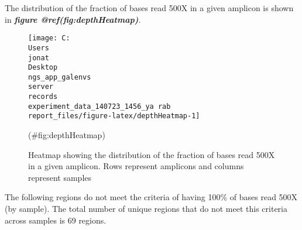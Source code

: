 \documentclass[
]{article}
\begin{document}
The distribution of the fraction of bases read 500X in a given amplicon is shown in \textbf{\emph{figure @ref(fig:depthHeatmap)}}.

\begin{figure}
\texttt{[image: C:\\Users\\jonat\\Desktop\\ngs\_app\_galenvs\\server\\records\\experiment\_data\_140723\_1456\_ya rab\\report\_files/figure-latex/depthHeatmap-1]} \caption[Depth 500X Heatmap]{Heatmap showing the distribution of the fraction of bases read 500X in a given amplicon. Rows represent amplicons and columns represent samples}(\#fig:depthHeatmap)
\end{figure}

The following regions do not meet the criteria of having 100\% of bases read 500X (by sample). The total number of unique regions that do not meet this criteria across samples is 69 regions.
\end{document}
